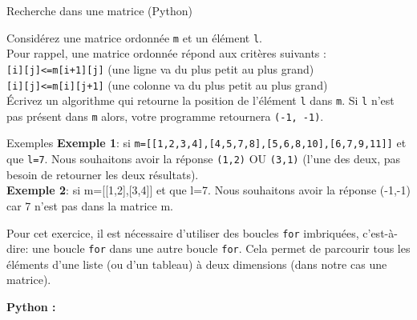 \begin{Exercice}[20 minutes] Recherche dans une matrice (Python) %
    

    Considérez une matrice ordonnée \lstinline{m} et un élément \lstinline{l}.\\
    
    Pour rappel, une matrice ordonnée répond aux critères suivants :\\
     \lstinline{[i][j]<=m[i+1][j]} (une ligne va du plus petit au plus grand)\\
     \lstinline{[i][j]<=m[i][j+1]} (une colonne va du plus petit au plus grand)\\
 
    
    Écrivez un algorithme qui retourne la position de l’élément \lstinline{l} dans \lstinline{m}. Si \lstinline{l} n’est pas présent dans \lstinline{m} alors, votre programme retournera \lstinline{(-1, -1)}.\\
    
    \begin{Example}{\faTerminal \quad Exemples}
        \textbf{Exemple 1}: si \lstinline{m=[[1,2,3,4],[4,5,7,8],[5,6,8,10],[6,7,9,11]]} et que \lstinline{l=7}. Nous souhaitons avoir la réponse \lstinline{(1,2)} OU \lstinline{(3,1)} (l’une des deux, pas besoin de retourner les deux résultats).\\

        \textbf{Exemple 2}: si m=[[1,2],[3,4]] et que l=7. Nous souhaitons avoir la réponse (-1,-1) car 7 n’est pas dans la matrice m.
    \end{Example}

    

    \begin{conseil}
    Pour cet exercice, il est nécessaire d'utiliser des boucles \lstinline{for} imbriquées, c'est-à-dire: une boucle \lstinline{for} dans une autre boucle \lstinline{for}. Cela permet de parcourir tous les éléments d'une liste (ou d'un tableau) à deux dimensions (dans notre cas une matrice). 
    \end{conseil}

    \begin{solution}
        \textbf{Python :}
        
    \end{solution}

\end{Exercice}


